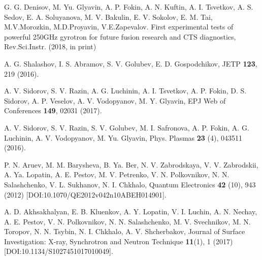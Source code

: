 \documentclass[aip, apl, amsmath,amssymb, reprint]{revtex4-1}
\begin{document}
\begin{thebibliography}{6}
 G. G. Denisov, M. Yu. Glyavin, A. P. Fokin, A. N. Kuftin, A. I. Tsvetkov, A. S. Sedov, E. A. Soluyanova, M. V. Bakulin, E. V. Sokolov, E. M. Tai, M.V.Morozkin, M.D.Proyavin, V.E.Zapevalov.
First experimental tests of powerful 250GHz gyrotron for future fusion research and CTS diagnostics, Rev.Sci.Instr. (2018, in print)



A. G. Shalashov, I. S. Abramov, S. V. Golubev, E. D. Gospodchikov, JETP \textbf{123}, 219 (2016).

A. V. Sidorov, S. V. Razin, A. G. Luchinin, A. I. Tsvetkov, A. P. Fokin, D. S. Sidorov, A. P. Veselov, A. V. Vodopyanov, M. Y. Glyavin, EPJ Web of Conferences \textbf{149}, 02031 (2017).

A. V. Sidorov, S. V. Razin, S. V. Golubev, M. I. Safronova, A. P. Fokin, A. G. Luchinin, A. V. Vodopyanov,  M. Yu. Glyavin, Phys. Plasmas \textbf{23} (4), 043511 (2016).

P. N. Aruev, M. M. Barysheva, B. Ya. Ber, N. V. Zabrodskaya, V. V. Zabrodskii, A. Ya. Lopatin, A. E. Pestov, M. V. Petrenko, V. N. Polkovnikov, N. N. Salashchenko, V. L. Sukhanov, N. I. Chkhalo,
Quantum Electronics \textbf{42} (10), 943 (2012) [DOI:10.1070/QE2012v042n10ABEH014901].

A. D. Akhsakhalyan, E. B. Kluenkov, A. Y. Lopatin, V. I. Luchin, A. N. Nechay, A. E. Pestov, V. N. Polkovnikov, N. N. Salashchenko, M. V. Svechnikov, M. N. Toropov,  N. N. Tsybin, N. I. Chkhalo, A. V. Shcherbakov,
Journal of Surface Investigation: X-ray, Synchrotron and Neutron Technique \textbf{11}(1), 1 (2017) [DOI:10.1134/S1027451017010049]. 


\end{thebibliography}
\end{document}
